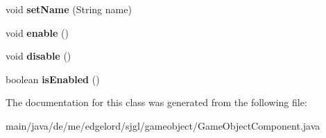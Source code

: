 \begin{DoxyCompactItemize}
\mbox{\label{classde_1_1me_1_1edgelord_1_1sjgl_1_1gameobject_1_1_game_object_component_a096c46ead54e185689465462f2720b3c}} 
void {\bfseries set\+Name} (String name)
\item 
\mbox{\label{classde_1_1me_1_1edgelord_1_1sjgl_1_1gameobject_1_1_game_object_component_a58419fd6d5037b531efbb7926f840213}} 
void {\bfseries enable} ()
\item 
\mbox{\label{classde_1_1me_1_1edgelord_1_1sjgl_1_1gameobject_1_1_game_object_component_a17f3c5f475fe42b4834683d3052422cd}} 
void {\bfseries disable} ()
\item 
\mbox{\label{classde_1_1me_1_1edgelord_1_1sjgl_1_1gameobject_1_1_game_object_component_a972dceb445ed14ec37e31e3dbea07c10}} 
boolean {\bfseries is\+Enabled} ()
\end{DoxyCompactItemize}


The documentation for this class was generated from the following file\+:\begin{DoxyCompactItemize}
\item 
main/java/de/me/edgelord/sjgl/gameobject/Game\+Object\+Component.\+java\end{DoxyCompactItemize}

